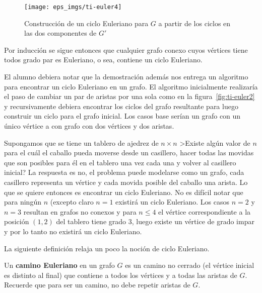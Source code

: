 \begin{teorema}
\begin{demostracion}
\begin{inducciondemo}
  \begin{figure}[h!]
  \centering
  \texttt{[image: eps\_imgs/ti-euler4]}
  \caption{Construcción de un ciclo Euleriano para $G$ a partir de los ciclos en las dos componentes de $G'$}
  \label{fig:ti-euler4}
  \end{figure}
  
  Por inducción se sigue entonces que cualquier grafo conexo cuyos vértices tiene todos grado par es Euleriano, o sea, contiene un ciclo Euleriano.
\end{inducciondemo}
\end{demostracion}
\end{teorema}

El alumno debiera notar que la demostración además nos entrega un algoritmo para encontrar un ciclo Euleriano en un grafo.
El algoritmo inicialmente realizaría el paso de cambiar un par de aristas por una sola como en la figura~\ref{fig:ti-euler2} y recursivamente debiera encontrar los ciclos del grafo resultante para luego construir un ciclo para el grafo inicial.
Los casos base serían un grafo con un único vértice a con grafo con dos vértices y dos aristas.

\begin{ejemplo}
Supongamos que se tiene un tablero de ajedrez de $n\times n$
>Existe algún valor de $n$ para el cuál el caballo pueda moverse desde un casillero, hacer todas las movidas que son posibles para él en el tablero una vez cada una y volver al casillero inicial?
La respuesta es no, el problema puede modelarse como un grafo, cada casillero representa un vértice y cada movida posible del caballo una arista.
Lo que se quiere entonces es encontrar un ciclo Euleriano.
No es difícil notar que para ningún $n$ (excepto claro $n=1$ existirá un ciclo Euleriano.
Los casos $n=2$ y $n=3$ resultan en grafos no conexos y para $n\leq 4$ el vértice correspondiente a la posición $(1,2)$ del tablero tiene grado $3$, luego existe un vértice de grado impar y por lo tanto no existirá un ciclo Euleriano.
\end{ejemplo}

La siguiente definición relaja un poco la noción de ciclo Euleriano.

\begin{definicion}
Un {\bf camino Euleriano} en un grafo $G$ es un camino no cerrado (el vértice inicial es distinto al final) que contiene a todos los vértices y a todas las aristas de $G$.
Recuerde que para ser un camino, no debe repetir aristas de $G$.
\end{definicion}

